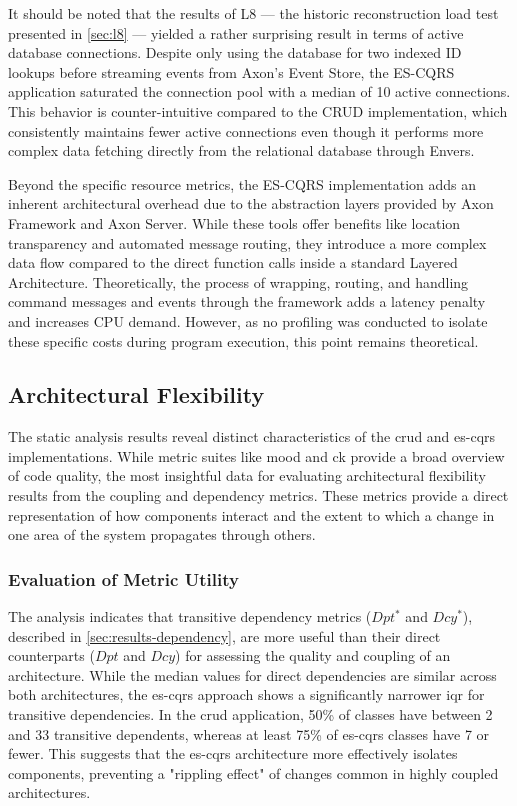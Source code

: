 It should be noted that the results of L8 --- the historic reconstruction load test presented in \autoref{sec:l8} --- yielded a rather surprising result in terms of active database connections. Despite only using the database for two indexed ID lookups before streaming events from Axon's Event Store, the ES-CQRS application saturated the connection pool with a median of 10 active connections. This behavior is counter-intuitive compared to the CRUD implementation, which consistently maintains fewer active connections even though it performs more complex data fetching directly from the relational database through Envers.

Beyond the specific resource metrics, the ES-CQRS implementation adds an inherent architectural overhead due to the abstraction layers provided by Axon Framework and Axon Server. While these tools offer benefits like location transparency and automated message routing, they introduce a more complex data flow compared to the direct function calls inside a standard Layered Architecture. Theoretically, the process of wrapping, routing, and handling command messages and events through the framework adds a latency penalty and increases CPU demand. However, as no profiling was conducted to isolate these specific costs during program execution, this point remains theoretical.

\subsection{Architectural Flexibility}
\label{sec:architectural-flexibility}

The static analysis results reveal distinct characteristics of the \gls{crud} and \gls{es}-\gls{cqrs} implementations. While metric suites like \gls{mood} and \acrlong{ck} provide a broad overview of code quality, the most insightful data for evaluating architectural flexibility results from the coupling and dependency metrics. These metrics provide a direct representation of how components interact and the extent to which a change in one area of the system propagates through others.

\subsubsection{Evaluation of Metric Utility}

The analysis indicates that transitive dependency metrics ($Dpt^*$ and $Dcy^*$), described in \autoref{sec:results-dependency}, are more useful than their direct counterparts ($Dpt$ and $Dcy$) for assessing the quality and coupling of an architecture. While the median values for direct dependencies are similar across both architectures, the \gls{es}-\gls{cqrs} approach shows a significantly narrower \gls{iqr} for transitive dependencies. In the \gls{crud} application, 50\% of classes have between 2 and 33 transitive dependents, whereas at least 75\% of \gls{es}-\gls{cqrs} classes have 7 or fewer. This suggests that the \gls{es}-\gls{cqrs} architecture more effectively isolates components, preventing a "rippling effect" of changes common in highly coupled architectures.

